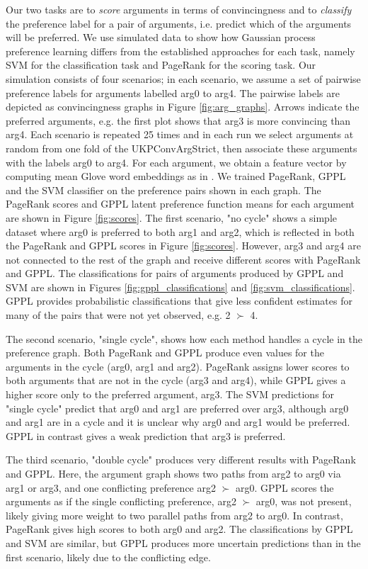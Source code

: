 Our two tasks are to \emph{score} arguments in terms of convincingness and to 
\emph{classify} the preference label for a pair of arguments, i.e. predict which of the arguments will be preferred. 
We use simulated data to show how Gaussian process preference learning
differs from the established approaches for each task, namely SVM for 
the classification task and PageRank for the scoring task.
Our simulation consists of four scenarios; 
in each scenario, we assume a set of pairwise preference labels for arguments labelled
arg0 to arg4.  
The pairwise labels are depicted as convincingness graphs in Figure \ref{fig:arg_graphs}.
Arrows indicate the     
preferred arguments, e.g. the first plot shows that arg3 is more convincing than arg4. 
Each scenario is repeated 25 times and in each run we select arguments at random from one fold of the UKPConvArgStrict, 
then associate these arguments with the labels arg0 to arg4.  
For each argument, we obtain a feature vector by computing mean Glove word embeddings as in \cite{habernal2016argument}.
We trained PageRank, GPPL and the SVM classifier on the preference pairs shown in each graph. The PageRank scores and GPPL latent preference function means for each argument are shown in Figure \ref{fig:scores}. The first scenario, "no cycle" shows a simple dataset where
arg0 is preferred to both arg1 and arg2, which is reflected in both the PageRank and GPPL scores in Figure \ref{fig:scores}. However, arg3 and arg4 are not connected to the rest of the graph and receive different scores with PageRank and GPPL. 
The classifications for pairs of arguments produced by GPPL and SVM are shown in 
Figures \ref{fig:gppl_classifications} and \ref{fig:svm_classifications}.
GPPL provides probabilistic classifications that give less confident estimates for many
of the pairs that were not yet observed, e.g. 2 $\succ$ 4.

The second scenario, "single cycle", shows how each method handles a cycle in the preference graph.
Both PageRank and GPPL produce even values for the arguments in the cycle (arg0, arg1 and arg2). PageRank assigns lower scores to both arguments that are not in the cycle (arg3 and arg4), while GPPL gives a higher score only to the preferred argument, arg3. The 
SVM predictions for  "single cycle" predict that arg0 and arg1 are preferred over arg3,
although arg0 and arg1 are in a cycle and it is unclear why arg0 and arg1 would be preferred. GPPL in contrast gives a weak prediction that arg3 is preferred.

The third scenario, "double cycle" produces very different results with PageRank and GPPL. Here, the argument graph shows two paths from arg2 to arg0 via arg1 or arg3, and one conflicting
preference arg2 $\succ$ arg0. GPPL scores the arguments as if the single conflicting preference, arg2 $\succ$ arg0, was not present, likely giving more weight to two parallel paths from arg2 to arg0. 
In contrast, PageRank gives high scores to both arg0 and arg2.
The classifications by GPPL and SVM are similar, but GPPL produces more uncertain 
predictions than in the first scenario, likely due to the conflicting edge.

